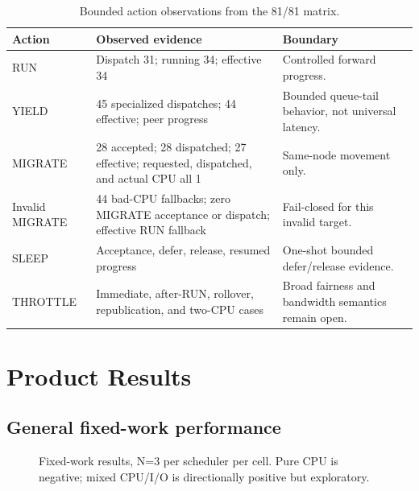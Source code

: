 \documentclass[11pt,a4paper,oneside]{report}
\begin{document}
\begin{table}[H]
\centering
\caption{Bounded action observations from the 81/81 matrix.}
\begin{tabularx}{\textwidth}{@{}p{26mm}p{62mm}Y@{}}
\toprule
\textbf{Action} & \textbf{Observed evidence} & \textbf{Boundary} \\
\midrule
RUN & Dispatch 31; running 34; effective 34 & Controlled forward progress. \\
YIELD & 45 specialized dispatches; 44 effective; peer progress & Bounded
queue-tail behavior, not universal latency. \\
MIGRATE & 28 accepted; 28 dispatched; 27 effective; requested, dispatched, and
actual CPU all 1 & Same-node movement only. \\
Invalid MIGRATE & 44 bad-CPU fallbacks; zero MIGRATE acceptance or dispatch;
effective RUN fallback & Fail-closed for this invalid target. \\
SLEEP & Acceptance, defer, release, resumed progress & One-shot bounded
defer/release evidence. \\
THROTTLE & Immediate, after-RUN, rollover, republication, and two-CPU cases &
Broad fairness and bandwidth semantics remain open. \\
\bottomrule
\end{tabularx}
\end{table}

\chapter{Product Results}

\section{General fixed-work performance}

\begin{figure}[H]
\centering
{}
\caption{Fixed-work results, N=3 per scheduler per cell. Pure CPU is negative;
mixed CPU/I/O is directionally positive but exploratory.}
\label{fig:fixed}
\end{figure}
\end{document}
